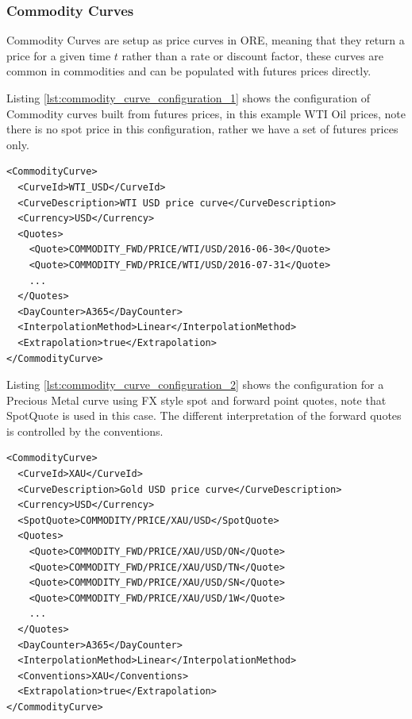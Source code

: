 \subsubsection{Commodity Curves}

Commodity Curves are setup as price curves in ORE, meaning that they return a price for a given time $t$ rather than a rate or discount factor, these curves are common in commodities and can be populated with futures prices directly.

Listing \ref{lst:commodity_curve_configuration_1} shows the configuration of Commodity curves built from futures prices, in this example WTI Oil prices, note there is no spot price in this configuration, rather we have a set of futures prices only.

\begin{longlisting}
\begin{verbatim}
<CommodityCurve>
  <CurveId>WTI_USD</CurveId>
  <CurveDescription>WTI USD price curve</CurveDescription>
  <Currency>USD</Currency>
  <Quotes>
    <Quote>COMMODITY_FWD/PRICE/WTI/USD/2016-06-30</Quote>
    <Quote>COMMODITY_FWD/PRICE/WTI/USD/2016-07-31</Quote>
    ...
  </Quotes>
  <DayCounter>A365</DayCounter>
  <InterpolationMethod>Linear</InterpolationMethod>
  <Extrapolation>true</Extrapolation>
</CommodityCurve>
\end{verbatim}
\caption{Commodity Curve Configuration for WTI Oil}
\label{lst:commodity_curve_configuration_1}
\end{longlisting}

Listing \ref{lst:commodity_curve_configuration_2} shows the configuration for a Precious Metal curve using FX style spot and forward point quotes, note that SpotQuote is used in this case. The different interpretation of the forward quotes is controlled by the conventions.

\begin{longlisting}
\begin{verbatim}
<CommodityCurve>
  <CurveId>XAU</CurveId>
  <CurveDescription>Gold USD price curve</CurveDescription>
  <Currency>USD</Currency>
  <SpotQuote>COMMODITY/PRICE/XAU/USD</SpotQuote>
  <Quotes>
    <Quote>COMMODITY_FWD/PRICE/XAU/USD/ON</Quote>
    <Quote>COMMODITY_FWD/PRICE/XAU/USD/TN</Quote>
    <Quote>COMMODITY_FWD/PRICE/XAU/USD/SN</Quote>
    <Quote>COMMODITY_FWD/PRICE/XAU/USD/1W</Quote>
    ...
  </Quotes>
  <DayCounter>A365</DayCounter>
  <InterpolationMethod>Linear</InterpolationMethod>
  <Conventions>XAU</Conventions>
  <Extrapolation>true</Extrapolation>
</CommodityCurve>
\end{verbatim}
\caption{Commodity Curve Configuration for Gold in USD}
\label{lst:commodity_curve_configuration_2}
\end{longlisting}

